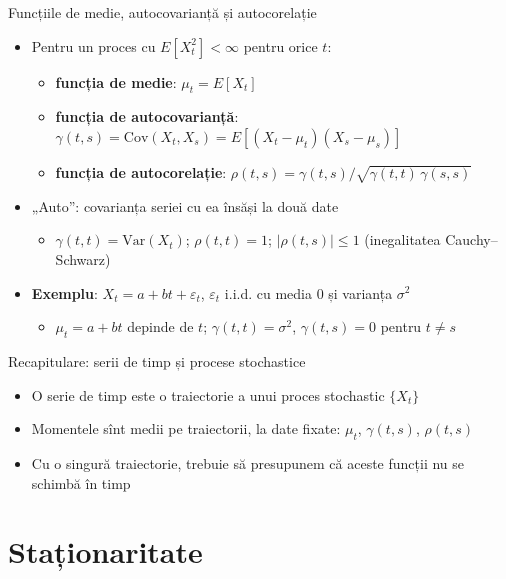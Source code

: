 \begin{frame}{Funcțiile de medie, autocovarianță și autocorelație}
\itemsize{\small}
\begin{itemize}
    \item Pentru un proces cu $E[X_t^2] < \infty$ pentru orice $t$:
    \begin{itemize}
        \item \textbf{funcția de medie}: $\mu_t = E[X_t]$
        \item \textbf{funcția de autocovarianță}: $\gamma(t, s) = \mathrm{Cov}(X_t, X_s) = E[(X_t - \mu_t)(X_s - \mu_s)]$
        \item \textbf{funcția de autocorelație}: $\rho(t, s) = \gamma(t, s)/\sqrt{\gamma(t, t)\,\gamma(s, s)}$
    \end{itemize}
    \item „Auto”: covarianța seriei cu ea însăși la două date
    \begin{itemize}
        \item $\gamma(t, t) = \mathrm{Var}(X_t)$; $\rho(t, t) = 1$; $|\rho(t, s)| \le 1$ (inegalitatea Cauchy--Schwarz)
    \end{itemize}
    \item \textbf{Exemplu}: $X_t = a + bt + \varepsilon_t$, $\varepsilon_t$ i.i.d. cu media 0 și varianța $\sigma^2$
    \begin{itemize}
        \item $\mu_t = a + bt$ depinde de $t$; $\gamma(t, t) = \sigma^2$, $\gamma(t, s) = 0$ pentru $t \ne s$
    \end{itemize}
\end{itemize}
\end{frame}

\begin{frame}{Recapitulare: serii de timp și procese stochastice}
\itemsize{\small}
\begin{itemize}
    \item O serie de timp este o traiectorie a unui proces stochastic $\{X_t\}$
    \item Momentele sînt medii pe traiectorii, la date fixate: $\mu_t$, $\gamma(t, s)$, $\rho(t, s)$
    \item Cu o singură traiectorie, trebuie să presupunem că aceste funcții nu se schimbă în timp
\end{itemize}
\end{frame}


\section{Staționaritate}

